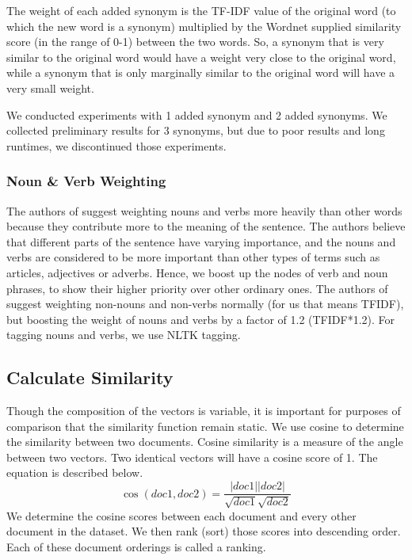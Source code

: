 \documentclass{acm_proc_article-sp}
\begin{document}
The weight of each added synonym is the TF-IDF value of the original word (to which the new word is a synonym) multiplied by the Wordnet supplied similarity  score (in the range of 0-1) between the two words. So, a synonym that is very similar to the original word would have a weight very close to the original word, while a synonym that is only marginally similar to the original word will have a very small weight.

We conducted experiments with 1 added synonym and 2 added synonyms. We collected preliminary results for 3 synonyms, but due to poor results and long runtimes, we discontinued those experiments.

\subsubsection{Noun \& Verb Weighting}
The authors of \cite{wang2009syntactic} suggest weighting nouns and verbs more heavily than other words because they contribute more to the meaning of the sentence. The authors believe that different parts of the sentence have varying importance, and the nouns and verbs are considered to be more important than other types of terms such as articles, adjectives or adverbs. Hence, we boost up the nodes of verb and noun phrases, to show their higher priority over other ordinary ones. The authors of \cite{wang2009syntactic} suggest weighting non-nouns and non-verbs normally (for us that means TFIDF), but boosting the weight of nouns and verbs by a factor of 1.2 (TFIDF*1.2). For tagging nouns and verbs, we use NLTK tagging.

\subsection{Calculate Similarity}
Though the composition of the vectors is variable, it is important for purposes of comparison that the similarity function remain static. We use cosine to determine the similarity between two documents. Cosine similarity is a measure of the angle between two vectors. Two identical vectors will have a cosine score of 1. The equation is described below.
\begin{equation}
\cos(doc1,doc2) =  \frac{|doc1||doc2|}{\sqrt{doc1}\sqrt{doc2}}
\end{equation}
We determine the cosine scores between each document and every other document in the dataset. We then rank (sort) those scores into descending order. Each of these document orderings is called a ranking. 
\end{document}
